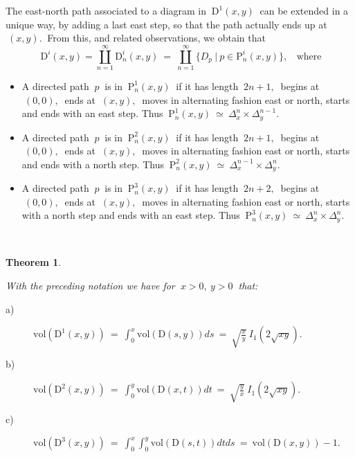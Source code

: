 \documentclass[10pt,leqeq]{article}
\newtheorem{thm}{Theorem}%
\begin{document}
The east-north path associated to a diagram in $\ \mathrm{D}^{1}(x,y) \ $
can be extended in a unique way, by adding a last east step, so that the path actually ends up at $ \ (x,y) .\ $ From this, and related observations,  we obtain that  
$$\ \mathrm{D}^{i}(x,y) = \coprod_{n=1}^{\infty}\mathrm{D}_n^{i}(x,y)
\ =  \ \coprod_{n=1}^{\infty}\{ D_p  \ | \ p \in \mathrm{P}_n^{i}(x,y) \}, 
\ \ \ \ \mbox{where}$$

\begin{itemize}
  \item A directed path $\ p \ $ is in  $ \  \mathrm{P}_n^{1}(x,y)\ $ if it has length $\ 2n+1, \ $ begins at $\ (0,0), \ $ ends at $ \ (x,y), \ $ moves in alternating fashion east or north, starts and ends with an east step. Thus $\ \mathrm{P}_n^{1}(x,y) \ \simeq \ \Delta^{n}_x \times \Delta^{n-1}_y.$
  \item A directed path $\ p \ $ is in  $ \ \mathrm{P}_n^{2}(x,y) \ $ if it has length $\ 2n+1, \ $ begins at $\ (0,0), \ $ ends at $ \ (x,y), \ $ moves in alternating fashion east or north, starts and ends with a north step.
      Thus $\ \mathrm{P}_n^{2}(x,y) \ \simeq \ \Delta^{n-1}_x \times \Delta^{n}_y.$
  \item A directed path $\ p \ $ is in  $ \ \mathrm{P}_n^{3}(x,y) \ $ if it has length $\ 2n+2, \ $ begins at $\ (0,0), \ $ ends at $ \ (x,y), \ $ moves in alternating fashion east or north, starts with a north step and ends with an east step. Thus $\ \mathrm{P}_n^{3}(x,y) \ \simeq \ \Delta^{n}_x \times \Delta^{n}_y.$
\end{itemize}

\

\begin{thm}\label{yc}
{\em   With the preceding notation we have for $\ x>0, \ y> 0 \ $ that:
  \begin{description}
    \item[a)] $ \displaystyle \mathrm{vol}(\mathrm{D}^{1}(x,y)) \ = \ 
    \int_{0}^{x}\mathrm{vol}(\mathrm{D}(s,y))ds \ = \ \sqrt{\frac{x}{y} } \ I_1(2\sqrt{xy}).$
    \item[b)] $\displaystyle \mathrm{vol}(\mathrm{D}^{2}(x,y)) \ = \ 
    \int_{0}^{y}\mathrm{vol}(\mathrm{D}(x,t))dt \ = \ \sqrt{\frac{y}{x} } \ I_1(2\sqrt{xy}).$
    \item[c)] $\displaystyle \mathrm{vol}(\mathrm{D}^{3}(x,y)) \ = \ 
    \int_{0}^{x}\int_{0}^{y}\mathrm{vol}(\mathrm{D}(s,t))dtds \ = \ \mathrm{vol}(\mathrm{D}(x,y)) -1.$
  \end{description}
}
\end{thm}
\end{document}

